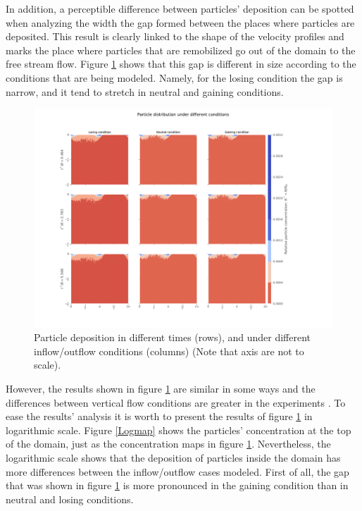 \documentclass[draft,linenumbers]{agujournal2018}
\begin{document}
In addition, a perceptible difference between particles' deposition can be spotted when analyzing the width the gap formed between the places where particles are deposited. This result is clearly linked to the shape of the velocity profiles and marks the place where particles that are remobilized go out of the domain to the free stream flow. Figure \ref{Heatmap} shows that this gap is different in size according to the conditions that are being modeled. Namely, for the losing condition the gap is narrow, and it tend to stretch in neutral and gaining conditions. 

\begin{figure}[ht]
\centering
\includegraphics[trim=0.2cm 0.2cm 0.2cm 0.2cm, width=45pc]
{181203_Concentrations.pdf}
\caption{Particle deposition in different times (rows), and under different inflow/outflow conditions (columns) (Note that axis are not to scale).}
\label{Heatmap}
\end{figure}

However, the results shown in figure \ref{Heatmap} are similar in some ways and the differences between vertical flow conditions are greater in the experiments \citep{Fox2018}. To ease the results' analysis it is worth to present the results of figure \ref{Heatmap} in logarithmic scale. Figure \ref{Logmap} shows the particles' concentration at the top of the domain, just as the concentration maps in figure \ref{Heatmap}. Nevertheless, the logarithmic scale shows that the deposition of particles inside the domain has more differences between the inflow/outflow cases modeled. First of all, the gap that was shown in figure \ref{Heatmap} is more pronounced in the gaining condition than in neutral and losing conditions. 
\end{document}
